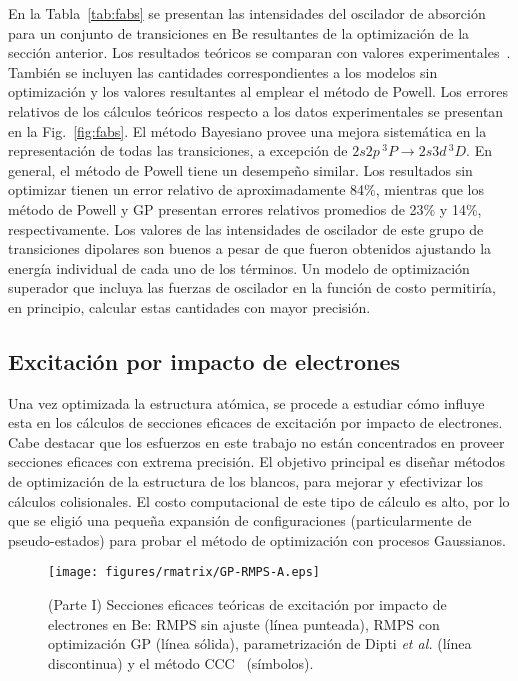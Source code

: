 En la Tabla~\ref{tab:fabs} se presentan las intensidades del oscilador 
de absorción para un conjunto de transiciones en Be resultantes de la 
optimización de la sección anterior. Los resultados teóricos se comparan 
con valores experimentales~\cite{NIST}. También se incluyen las 
cantidades correspondientes a los modelos sin optimización y los valores 
resultantes al emplear el método de Powell. Los errores relativos de 
los cálculos teóricos respecto a los datos experimentales se presentan 
en la Fig.~\ref{fig:fabs}. El método Bayesiano provee una mejora 
sistemática en la representación de todas las transiciones, a excepción 
de $2s2p\,^3\!P\rightarrow 2s3d\,^3\!D$. En general, el método de Powell 
tiene un desempeño similar. Los resultados sin optimizar tienen un error 
relativo de aproximadamente 84\%, mientras que los método de Powell y GP 
presentan errores relativos promedios de 23\% y 14\%, respectivamente. 
Los valores de las intensidades de oscilador de este grupo de 
transiciones dipolares son buenos a pesar de que fueron obtenidos 
ajustando la energía individual de cada uno de los términos. Un modelo 
de optimización superador que incluya las fuerzas de oscilador en la 
función de costo permitiría, en principio, calcular estas cantidades con 
mayor precisión.

\subsection{Excitación por impacto de electrones}

Una vez optimizada la estructura atómica, se procede a estudiar cómo 
influye esta en los cálculos de secciones eficaces de excitación por 
impacto de electrones. Cabe destacar que los esfuerzos en este trabajo 
no están concentrados en proveer secciones eficaces con extrema 
precisión. El objetivo principal es diseñar métodos de optimización de 
la estructura de los blancos, para mejorar y efectivizar los cálculos 
colisionales. El costo computacional de este tipo de cálculo es alto, 
por lo que se eligió una pequeña expansión de configuraciones 
(particularmente de pseudo-estados) para probar el método de 
optimización con procesos Gaussianos. 

\begin{figure}
\centering
\texttt{[image: figures/rmatrix/GP-RMPS-A.eps]} 
\caption[Secciones eficaces de excitación de Be (Parte I).]
{(Parte I) Secciones eficaces teóricas de excitación por impacto de 
electrones en Be: RMPS sin ajuste (línea punteada), RMPS con optimización 
GP (línea sólida), parametrización de Dipti \textit{et al.}
\cite{Dipti:19} (línea discontinua) y el método CCC~\cite{Fursa:97} 
(símbolos).}
\label{fig:crossBe-partI}
\end{figure}

